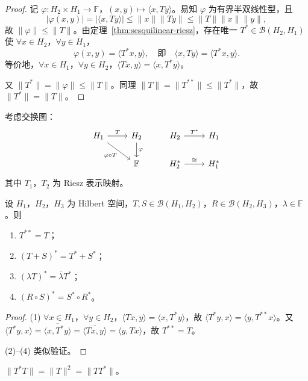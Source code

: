\documentclass[lang=cn,a4paper,newtx,section]{elegantbook}
\begin{document}
\begin{proof}
  记 $\varphi:H_2\times H_1\to\mathbb{F}$，$(x,y)\mapsto\langle x,Ty\rangle$。易知 $\varphi$ 为有界半双线性型，且
  \[
    |\varphi(x,y)|=|\langle x,Ty\rangle|\leq\|x\|\|Ty\|\leq\|T\|\|x\|\|y\|,
  \]
  故 $\|\varphi\|\leq\|T\|$。由定理~\ref{thm:sesquilinear-riesz}，存在唯一 $T^*\in\mathcal{B}(H_2,H_1)$ 使 $\forall x\in H_2$，$\forall y\in H_1$，
  \[
    \varphi(x,y)=\langle T^*x,y\rangle,\quad\text{即}\quad\langle x,Ty\rangle=\langle T^*x,y\rangle.
  \]
  等价地，$\forall x\in H_1$，$\forall y\in H_2$，$\langle Tx,y\rangle=\langle x,T^*y\rangle$。

  又 $\|T^*\|=\|\varphi\|\leq\|T\|$。同理 $\|T\|=\|T^{**}\|\leq\|T^*\|$，故 $\|T^*\|=\|T\|$。
\end{proof}

考虑交换图：
\[
  \begin{tikzcd}
    H_1 \arrow[r,"T"] \arrow[dr,"\varphi\circ T"'] & H_2 \arrow[d,"\varphi"] & H_2 \arrow[r,"T^*"] & H_1 \\
    & \mathbb{F} & H_2^* \arrow[r,"\cong"] & H_1^*
  \end{tikzcd}
\]
其中 $T_1$，$T_2$ 为 Riesz 表示映射。

\begin{proposition}[伴随算子性质]
  设 $H_1$，$H_2$，$H_3$ 为 Hilbert 空间，$T,S\in\mathcal{B}(H_1,H_2)$，$R\in\mathcal{B}(H_2,H_3)$，$\lambda\in\mathbb{F}$。则
  \begin{enumerate}
    \item $T^{**}=T$；
    \item $(T+S)^*=T^*+S^*$；
    \item $(\lambda T)^*=\overline{\lambda}T^*$；
    \item $(R\circ S)^*=S^*\circ R^*$。
  \end{enumerate}
\end{proposition}

\begin{proof}
  (1) $\forall x\in H_1$，$\forall y\in H_2$，$\langle Tx,y\rangle=\langle x,T^*y\rangle$，故 $\langle T^*y,x\rangle=\langle y,T^{**}x\rangle$。又 $\langle T^*y,x\rangle=\overline{\langle x,T^*y\rangle}=\overline{\langle Tx,y\rangle}=\langle y,Tx\rangle$，故 $T^{**}=T$。

  (2)--(4) 类似验证。
\end{proof}

\begin{proposition}
  $\|T^*T\|=\|T\|^2=\|TT^*\|$。
\end{proposition}
\end{document}
